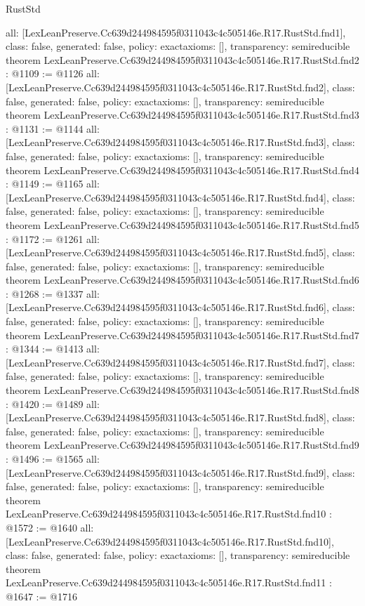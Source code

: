 \begin{lexlean}{RustStd}
\begin{coremodule}
{  all: [LexLeanPreserve.Cc639d244984595f0311043c4c505146e.R17.RustStd.fnd1],
  class: false,
  generated: false,
  policy: exact{axioms: []},
  transparency: semireducible
}
theorem LexLeanPreserve.Cc639d244984595f0311043c4c505146e.R17.RustStd.fnd2 : @1109 := @1126 {
  all: [LexLeanPreserve.Cc639d244984595f0311043c4c505146e.R17.RustStd.fnd2],
  class: false,
  generated: false,
  policy: exact{axioms: []},
  transparency: semireducible
}
theorem LexLeanPreserve.Cc639d244984595f0311043c4c505146e.R17.RustStd.fnd3 : @1131 := @1144 {
  all: [LexLeanPreserve.Cc639d244984595f0311043c4c505146e.R17.RustStd.fnd3],
  class: false,
  generated: false,
  policy: exact{axioms: []},
  transparency: semireducible
}
theorem LexLeanPreserve.Cc639d244984595f0311043c4c505146e.R17.RustStd.fnd4 : @1149 := @1165 {
  all: [LexLeanPreserve.Cc639d244984595f0311043c4c505146e.R17.RustStd.fnd4],
  class: false,
  generated: false,
  policy: exact{axioms: []},
  transparency: semireducible
}
theorem LexLeanPreserve.Cc639d244984595f0311043c4c505146e.R17.RustStd.fnd5 : @1172 := @1261 {
  all: [LexLeanPreserve.Cc639d244984595f0311043c4c505146e.R17.RustStd.fnd5],
  class: false,
  generated: false,
  policy: exact{axioms: []},
  transparency: semireducible
}
theorem LexLeanPreserve.Cc639d244984595f0311043c4c505146e.R17.RustStd.fnd6 : @1268 := @1337 {
  all: [LexLeanPreserve.Cc639d244984595f0311043c4c505146e.R17.RustStd.fnd6],
  class: false,
  generated: false,
  policy: exact{axioms: []},
  transparency: semireducible
}
theorem LexLeanPreserve.Cc639d244984595f0311043c4c505146e.R17.RustStd.fnd7 : @1344 := @1413 {
  all: [LexLeanPreserve.Cc639d244984595f0311043c4c505146e.R17.RustStd.fnd7],
  class: false,
  generated: false,
  policy: exact{axioms: []},
  transparency: semireducible
}
theorem LexLeanPreserve.Cc639d244984595f0311043c4c505146e.R17.RustStd.fnd8 : @1420 := @1489 {
  all: [LexLeanPreserve.Cc639d244984595f0311043c4c505146e.R17.RustStd.fnd8],
  class: false,
  generated: false,
  policy: exact{axioms: []},
  transparency: semireducible
}
theorem LexLeanPreserve.Cc639d244984595f0311043c4c505146e.R17.RustStd.fnd9 : @1496 := @1565 {
  all: [LexLeanPreserve.Cc639d244984595f0311043c4c505146e.R17.RustStd.fnd9],
  class: false,
  generated: false,
  policy: exact{axioms: []},
  transparency: semireducible
}
theorem LexLeanPreserve.Cc639d244984595f0311043c4c505146e.R17.RustStd.fnd10 : @1572 := @1640 {
  all: [LexLeanPreserve.Cc639d244984595f0311043c4c505146e.R17.RustStd.fnd10],
  class: false,
  generated: false,
  policy: exact{axioms: []},
  transparency: semireducible
}
theorem LexLeanPreserve.Cc639d244984595f0311043c4c505146e.R17.RustStd.fnd11 : @1647 := @1716 {
}
\end{coremodule}
\end{lexlean}
